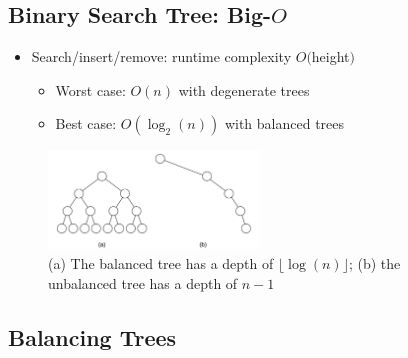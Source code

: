 \documentclass[
  10pt,
  english,
  letterpaper,
,tablecaptionabove
]{scrartcl}
\providecommand{\tightlist}{%
  \setlength{\itemsep}{0pt}\setlength{\parskip}{0pt}}
\begin{document}
\hypertarget{binary-search-tree-big-o}{%
\subsection{\texorpdfstring{Binary Search Tree:
Big-\(O\)}{Binary Search Tree: Big-O}}\label{binary-search-tree-big-o}}

\begin{itemize}
\tightlist
\item
  Search/insert/remove: runtime complexity \(O(\)height\()\)

  \begin{itemize}
  \tightlist
  \item
    Worst case: \(O(n)\) with degenerate trees
  \item
    Best case: \(O(\log_2(n))\) with balanced trees
  \end{itemize}
\end{itemize}

\begin{figure}
\centering
\includegraphics[width=0.5\textwidth,height=\textheight]{images/1.png}
\caption{(a) The balanced tree has a depth of
\(\lfloor \log(n) \rfloor\); (b) the unbalanced tree has a depth of
\(n-1\)}
\end{figure}

\hypertarget{balancing-trees}{%
\subsection{Balancing Trees}\label{balancing-trees}}
\end{document}
